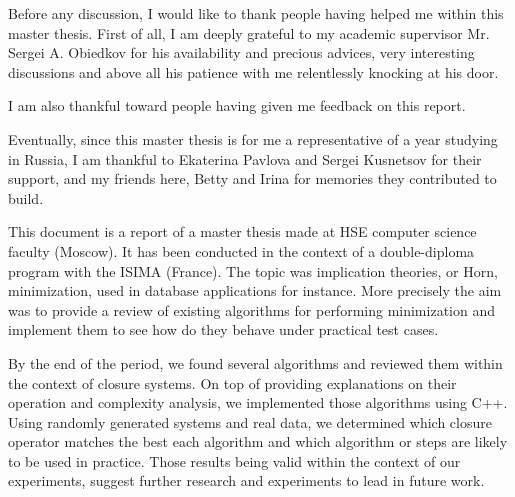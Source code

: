 \documentclass[a4paper, 10pt]{report}
\begin{document}
	
	

	



Before any discussion, I would like to thank people having helped me within this master thesis. First of all, I am deeply grateful to my academic supervisor Mr. Sergei A. Obiedkov for his availability and precious advices, very interesting discussions and above all his patience with me relentlessly knocking at his door.

I am also thankful toward people having given me feedback on this report.

Eventually, since this master thesis is for me a representative of a year studying in Russia, I am thankful to Ekaterina Pavlova and Sergei Kusnetsov for their support, and my friends here, Betty and Irina for memories they contributed to build.

\newpage
\listoffigures
\newpage

\newpage
\listoftables
\newpage

\newpage
\listofalgorithms
\newpage



This document is a report of a master thesis made at HSE computer science faculty (Moscow). It has been conducted in the context of a double-diploma program with the ISIMA (France). The topic was implication theories, or Horn, minimization, used in database applications for instance. More precisely the aim was to provide a review of existing algorithms for performing minimization and implement them to see how do they behave under practical test cases.

\vspace{1.2em}

By the end of the period, we found several algorithms and reviewed them within the context of closure systems. On top of providing explanations on their operation and complexity analysis, we implemented those algorithms using C++.
Using randomly generated systems and real data, we determined which closure operator matches the best each algorithm and which algorithm or steps are likely to be used in practice. Those results being valid within the context
of our experiments, suggest further research and experiments to lead in future work.
\end{document}
